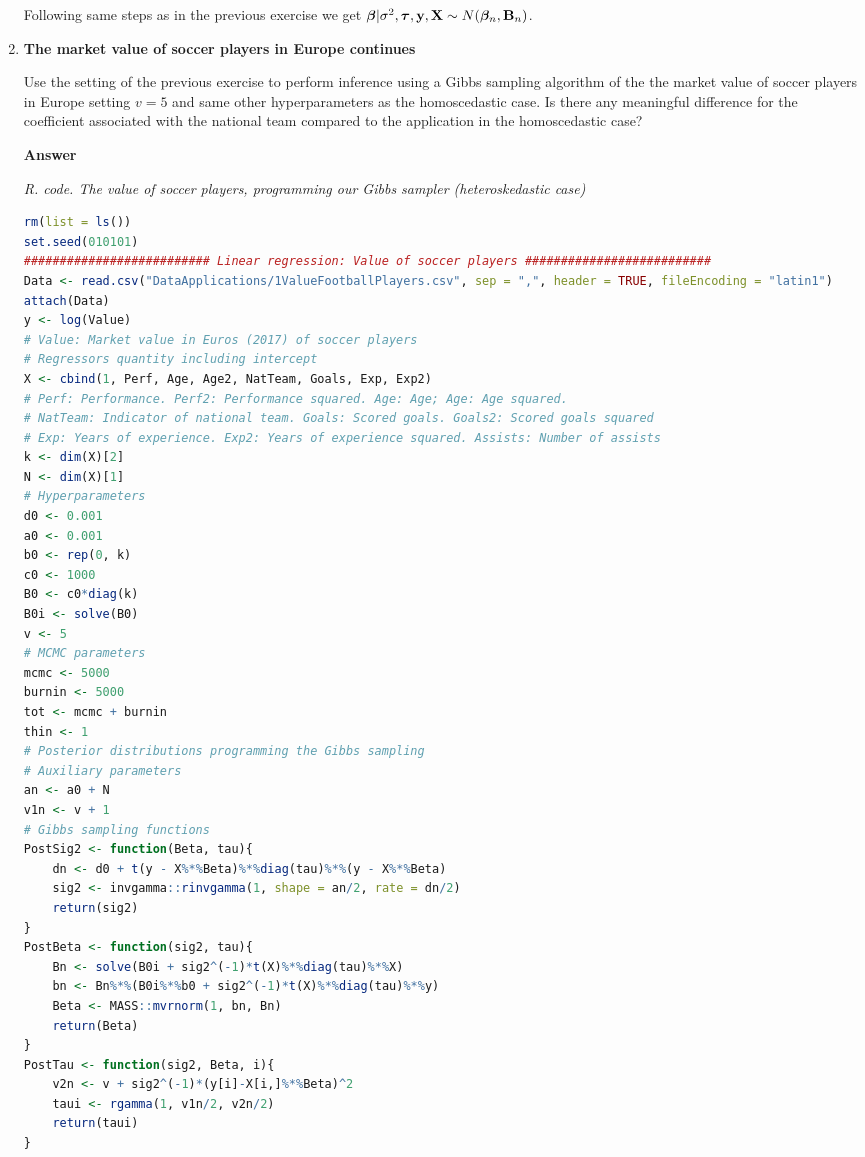 \begin{enumerate}[leftmargin=*]
Following same steps as in the previous exercise we get $\bm{\beta}|\sigma^2,\bm{\tau},{\bf{y}},{\bf{X}}\sim N(\bm{\beta}_n,{\bf{B}}_n)$.

\item \textbf{The market value of soccer players in Europe continues}

Use the setting of the previous exercise to perform inference using a Gibbs sampling algorithm of the the market value of soccer players in Europe setting $v=5$ and same other hyperparameters as the homoscedastic case. Is there any meaningful difference for the coefficient associated with the national team compared to the application in the homoscedastic case?

\textbf{Answer}


\begin{tcolorbox}[enhanced,width=4.67in,center upper,
	fontupper=\large\bfseries,drop shadow southwest,sharp corners]
	\textit{R. code. The value of soccer players, programming our Gibbs sampler (heteroskedastic case)}
	\begin{VF}
		\begin{lstlisting}[language=R]		
rm(list = ls())
set.seed(010101)
########################## Linear regression: Value of soccer players ##########################
Data <- read.csv("DataApplications/1ValueFootballPlayers.csv", sep = ",", header = TRUE, fileEncoding = "latin1")
attach(Data)
y <- log(Value) 
# Value: Market value in Euros (2017) of soccer players
# Regressors quantity including intercept
X <- cbind(1, Perf, Age, Age2, NatTeam, Goals, Exp, Exp2)
# Perf: Performance. Perf2: Performance squared. Age: Age; Age: Age squared. 
# NatTeam: Indicator of national team. Goals: Scored goals. Goals2: Scored goals squared
# Exp: Years of experience. Exp2: Years of experience squared. Assists: Number of assists
k <- dim(X)[2]
N <- dim(X)[1]
# Hyperparameters
d0 <- 0.001
a0 <- 0.001
b0 <- rep(0, k)
c0 <- 1000
B0 <- c0*diag(k)
B0i <- solve(B0)
v <- 5
# MCMC parameters
mcmc <- 5000
burnin <- 5000
tot <- mcmc + burnin
thin <- 1
# Posterior distributions programming the Gibbs sampling
# Auxiliary parameters
an <- a0 + N
v1n <- v + 1
# Gibbs sampling functions
PostSig2 <- function(Beta, tau){
	dn <- d0 + t(y - X%*%Beta)%*%diag(tau)%*%(y - X%*%Beta)
	sig2 <- invgamma::rinvgamma(1, shape = an/2, rate = dn/2)
	return(sig2)
}
PostBeta <- function(sig2, tau){
	Bn <- solve(B0i + sig2^(-1)*t(X)%*%diag(tau)%*%X)
	bn <- Bn%*%(B0i%*%b0 + sig2^(-1)*t(X)%*%diag(tau)%*%y)
	Beta <- MASS::mvrnorm(1, bn, Bn)
	return(Beta)
}
PostTau <- function(sig2, Beta, i){
	v2n <- v + sig2^(-1)*(y[i]-X[i,]%*%Beta)^2
	taui <- rgamma(1, v1n/2, v2n/2)
	return(taui)
}			
\end{lstlisting}
	\end{VF}
\end{tcolorbox} 


\end{enumerate}
